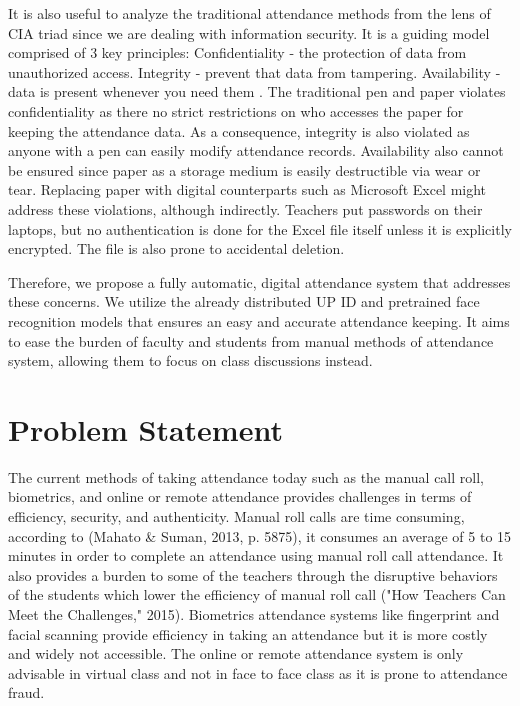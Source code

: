 It is also useful to analyze the traditional attendance methods from the lens of CIA triad since we are dealing with information security. It is a guiding model comprised of 3 key principles: Confidentiality - the protection of data from unauthorized access. Integrity - prevent that data from tampering. Availability - data is present whenever you need them \cite{cawthra2020data}. The traditional pen and paper violates confidentiality as there no strict restrictions on who accesses the paper for keeping the attendance data. As a consequence, integrity is also violated as anyone with a pen can easily modify attendance records. Availability also cannot be ensured since paper as a storage medium is easily destructible via wear or tear. Replacing paper with digital counterparts such as Microsoft Excel might address these violations, although indirectly. Teachers put passwords on their laptops, but no authentication is done for the Excel file itself unless it is explicitly encrypted. The file is also prone to accidental deletion.

Therefore, we propose a fully automatic, digital attendance system that addresses these concerns. We utilize the already distributed UP ID and pretrained face recognition models that ensures an easy and accurate attendance keeping. It aims to ease the burden of faculty and students from manual methods of attendance system, allowing them to focus on class discussions instead.

\section{Problem Statement}
The current methods of taking attendance today such as the manual call roll, biometrics, and online or remote attendance provides challenges in terms of efficiency, security, and authenticity. Manual roll calls are time consuming, according to (Mahato \& Suman, 2013, p. 5875), it consumes an average of 5 to 15 minutes in order to complete an attendance using manual roll call attendance. It also provides a burden to some of the teachers through the disruptive behaviors of the students which lower the efficiency of manual roll call ("How Teachers Can Meet the Challenges," 2015). Biometrics attendance systems like fingerprint and facial scanning provide efficiency in taking an attendance but it is more costly and widely not accessible. The online or remote attendance system is only advisable in virtual class and not in face to face class as it is prone to attendance fraud.

